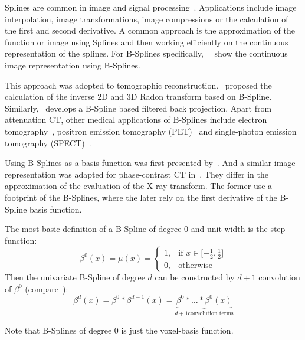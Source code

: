 Splines are common in image and signal processing~\cite{unser_splines_1999}. Applications include
image interpolation, image transformations, image compressions or the calculation of the first and
second derivative. A common approach is the approximation of the function or image using Splines and
then working efficiently on the continuous representation of the splines. For B-Splines
specifically,~\citeauthor{unser_fast_1991}~\cite{unser_fast_1991} show the continuous image
representation using B-Splines.

This approach was adopted to tomographic reconstruction.~\cite{la_riviere_spline-based_1998}
proposed the calculation of the inverse 2D and 3D Radon transform based on B-Spline.
Similarly,~\cite{horbelt_discretization_2002} develops a B-Spline based filtered back projection.
Apart from attenuation CT, other medical applications of B-Splines include electron
tomography~\cite{tran_robust_2013, tran_inverse_2014}, positron emission tomography
(PET)~\cite{nichols_spatiotemporal_2002, li_fast_2007, verhaeghe_investigation_2007} and
single-photon emission tomography (SPECT)~\cite{guedon_b-spline_1991, reutter_fully_2007}.

Using B-Splines as a basis function was first presented by~\cite{momey_new_2011,
	momey_b-spline_2012, momey_spline_2015}. And a similar image representation was adapted for
phase-contrast CT in~\cite{nilchian_fast_2013, nilchian_differential_2012, nilchian_spline_2015}.
They differ in the approximation of the evaluation of the X-ray transform. The former use a
footprint of the B-Splines, where the later rely on the first derivative of the B-Spline basis
function.

\begin{definition}[B-Spline]
	The most basic definition of a B-Spline of degree \(0\) and unit width is the step function:
	\begin{equation}
		\beta^0(x) = \mu(x) =
		\begin{cases}
			1, & \text{if } x \in \mathopen[\minus \frac{1}{2}, \frac{1}{2}\mathclose] \\
			0, & \text{otherwise}
		\end{cases}
	\end{equation}
	Then the univariate B-Spline of degree \(d\) can be constructed by \(d + 1\) convolution of \(\beta^0\)
	(compare~\cite{momey_new_2011}):
	\begin{equation}
		\beta^d(x) = \beta^0 * \beta^{d-1}(x) =
		\underbrace{\beta^0 * \dots * \beta^0(x)}_{d+1 \text{convolution terms}}
	\end{equation}
\end{definition}
Note that B-Splines of degree \(0\) is just the voxel-basis function.

